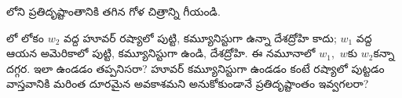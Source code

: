 \documentclass[../../../include/open-logic-section]{subfiles}
\begin{document}
\begin{prob}
లోని
ప్రతిదృష్టాంతానికి తగిన
గోళ చిత్రాన్ని గీయండి.
\end{prob}

\begin{prob}
  లో
  లోకం $w_2$ వద్ద హూవర్
  రష్యాలో పుట్టి, కమ్యూనిస్టుగా
  ఉన్నా దేశద్రోహి కాదు;
  $w_1$ వద్ద ఆయన
  అమెరికాలో పుట్టి,
  కమ్యూనిస్టుగా ఉండి,
  దేశద్రోహి. ఈ నమూనాలో
  $w_1$,~$w$కు
  $w_2$కన్నా దగ్గర. ఇలా ఉండడం తప్పనిసరా? హూవర్ కమ్యూనిస్టుగా
  ఉండడం కంటే రష్యాలో పుట్టడం వాస్తవానికి మరింత దూరమైన
  అవకాశమని అనుకోకుండానే ప్రతిదృష్టాంతం ఇవ్వగలరా?
\end{prob}
\end{document}
